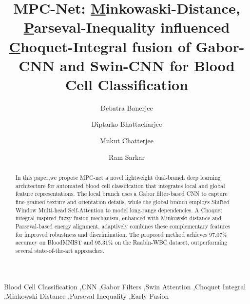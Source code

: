\documentclass[preprint,12pt]{elsarticle}
\begin{document}
\begin{frontmatter}

\title{MPC-Net: \underline{M}inkowaski-Distance, \underline{P}arseval-Inequality influenced \underline{C}hoquet-Integral fusion of Gabor-CNN and Swin-CNN for Blood Cell Classification}



\author{Debatra Banerjee}

\author{Diptarko Bhattacharjee}

\author{Mukut Chatterjee}


\author{Ram Sarkar}

\begin{abstract}
In this paper,we propose MPC-net a novel lightweight dual-branch deep learning architecture for automated blood cell classification that integrates local and global feature representations. The local branch uses a Gabor filter-based CNN to capture fine-grained texture and orientation details, while the global branch employs Shifted Window Multi-head Self-Attention to model long-range dependencies. A Choquet integral-inspired fuzzy fusion mechanism, enhanced with Minkowski distance and Parseval-based energy alignment, adaptively combines these complementary features for improved robustness and discrimination. The proposed method achieves 97.07\% accuracy on BloodMNIST and 95.31\% on the Raabin-WBC dataset, outperforming several state-of-the-art approaches.%
\end{abstract}

\begin{keyword}
Blood Cell Classification \sep CNN \sep Gabor Filters \sep Swin Attention \sep Choquet Integral \sep Minkowski Distance \sep Parseval Inequality \sep Early Fusion 
\end{keyword}


\end{frontmatter}
\end{document}
